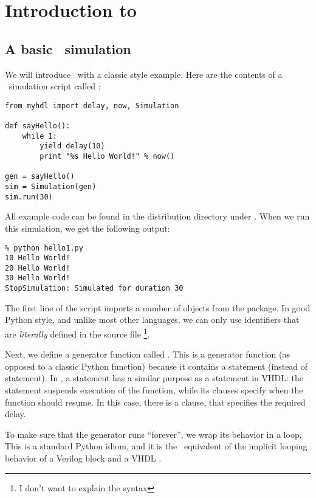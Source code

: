 \chapter{Introduction to \myhdl\ }

\section{A basic \myhdl\ simulation}

We will introduce \myhdl\ with a classic  style
example. Here are the contents of a \myhdl\ simulation script called
:

\begin{verbatim}
from myhdl import delay, now, Simulation

def sayHello():
    while 1:
        yield delay(10)
        print "%s Hello World!" % now()

gen = sayHello()
sim = Simulation(gen)
sim.run(30)
\end{verbatim}

All example code can be found in the distribution directory under
.  When we run this simulation, we get the
following output:

\begin{verbatim}
% python hello1.py
10 Hello World!
20 Hello World!
30 Hello World!
StopSimulation: Simulated for duration 30
\end{verbatim}

The first line of the script imports a
number of objects from the  package. In good Python style, and
unlike most other languages, we can only use identifiers that are
\emph{literally} defined in the source file \footnote{I don't want to
explain the  syntax}. 

Next, we define a generator function called
. This is a generator function (as opposed to
a classic Python function) because it contains a 
statement (instead of  statement). In \myhdl{}, a
 statement has a similar purpose as a 
statement in VHDL: the statement suspends execution of the function,
while its clauses specify when the function should resume. In this case,
there is a  clause, that specifies the required delay.

To make sure that the generator runs ``forever'', we wrap its behavior
in a  loop. This is a standard Python idiom, and it is
the \myhdl\ equivalent of the implicit looping behavior of a Verilog
 block and a VHDL .

